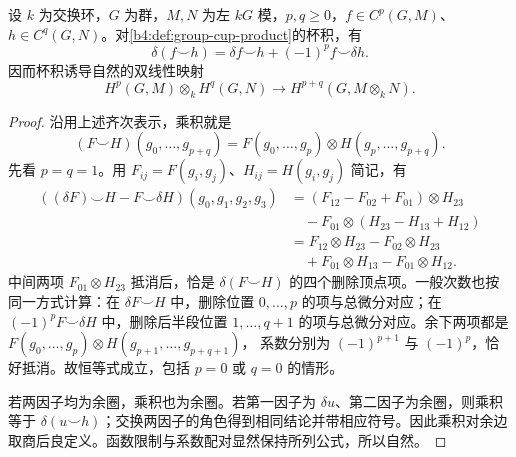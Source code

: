 \begin{proposition}\label{b4:prop:group-cup-leibniz}
	设 \(k\) 为交换环，\(G\) 为群，\(M,N\) 为左 \(kG\) 模，\(p,q\ge0\)，\(f\in C^p(G,M)\)、\(h\in C^q(G,N)\)。对\cref{b4:def:group-cup-product}的杯积，有
	\[
		\delta(f\smile h)=\delta f\smile h+(-1)^p f\smile\delta h.
	\]
	因而杯积诱导自然的双线性映射
	\[
		H^p(G,M)\otimes_kH^q(G,N) \longrightarrow H^{p+q}(G,M\otimes_kN).
	\]
\end{proposition}
\begin{proof}
	沿用上述齐次表示，乘积就是
	\[
		(F\smile H)(g_0,\ldots,g_{p+q}) =F(g_0,\ldots,g_p)\otimes H(g_p,\ldots,g_{p+q}).
	\]
	先看 \(p=q=1\)。用 \(F_{ij}=F(g_i,g_j)\)、\(H_{ij}=H(g_i,g_j)\) 简记，有
	\[
		\begin{aligned}
			((\delta F)\smile H-F\smile\delta H)(g_0,g_1,g_2,g_3) &=(F_{12}-F_{02}+F_{01})\otimes H_{23}\\
			&\quad-F_{01}\otimes(H_{23}-H_{13}+H_{12})\\
			&=F_{12}\otimes H_{23}-F_{02}\otimes H_{23}\\
			&\quad+F_{01}\otimes H_{13}-F_{01}\otimes H_{12}.
		\end{aligned}
	\]
	中间两项 \(F_{01}\otimes H_{23}\) 抵消后，恰是 \(\delta(F\smile H)\) 的四个删除顶点项。一般次数也按同一方式计算：在 \(\delta F\smile H\) 中，删除位置 \(0,\ldots,p\) 的项与总微分对应；在 \((-1)^pF\smile\delta H\) 中，删除后半段位置 \(1,\ldots,q+1\) 的项与总微分对应。余下两项都是 \(F(g_0,\ldots,g_p)\otimes H(g_{p+1},\ldots,g_{p+q+1})\)， 系数分别为 \((-1)^{p+1}\) 与 \((-1)^p\)，恰好抵消。故恒等式成立，包括 \(p=0\) 或 \(q=0\) 的情形。

	若两因子均为余圈，乘积也为余圈。若第一因子为 \(\delta u\)、第二因子为余圈，则乘积等于 \(\delta(u\smile h)\)；交换两因子的角色得到相同结论并带相应符号。因此乘积对余边取商后良定义。函数限制与系数配对显然保持所列公式，所以自然。
\end{proof}

